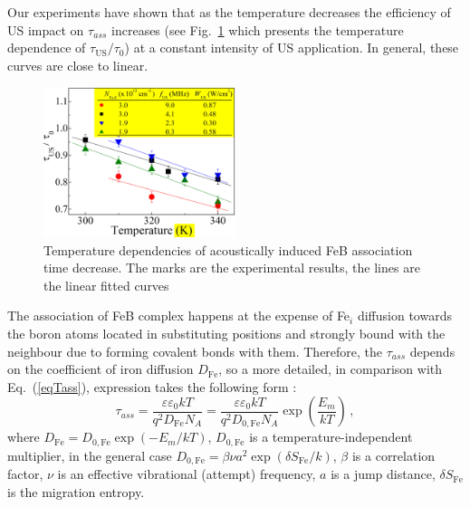 \documentclass[sn-mathphys]{sn-jnl}%
\theoremstyle{thmstyleone}%
\theoremstyle{thmstyletwo}%
\theoremstyle{thmstylethree}%
\begin{document}
Our experiments have shown that
as the temperature decreases the efficiency of US impact on $\tau_{ass}$ increases
(see Fig.~\ref{figTemp} which presents the temperature dependence of $\tau_\mathrm{US}/\tau_{0}$)
at a constant intensity of US application.
In general, these curves are close to linear.

\begin{figure}
\centering
 \includegraphics[width=0.5\textwidth]{Fig6}
\caption{
Temperature dependencies of  acoustically induced FeB association time decrease.
The marks are the experimental results, the lines are the linear fitted curves
}
\label{figTemp}       %
\end{figure}

The association of FeB complex happens at the  expense of  Fe$_i$ diffusion towards the
boron atoms located in substituting positions and strongly bound with the neighbour due to forming covalent bonds with them.
Therefore, the $\tau_{ass}$ depends on the coefficient of iron diffusion $D_\mathrm{Fe}$,
so a more detailed, in comparison with Eq.~(\ref{eqTass}), expression takes the following form \cite{FeBAssJAP2014,FeBJAP2005,FeBKin2019}:
\begin{equation}
\label{eqTass2}
\tau_{ass}=\frac{\varepsilon\varepsilon_0 kT}{q^2D_\mathrm{Fe}N_A}=
\frac{\varepsilon\varepsilon_0 kT}{q^2D_\mathrm{0,Fe}N_A}\exp\left(\frac{E_m}{kT}\right)\,,
\end{equation}
where
$D_\mathrm{Fe}=D_\mathrm{0,Fe}\exp(-E_m/kT)$,
$D_\mathrm{0,Fe}$ is a temperature-independent multiplier,
in the general case \cite{AZIZ2001,Stavola,WeberFe}
$D_\mathrm{0,Fe}=\beta\nu a^2\exp(\delta S_\mathrm{Fe}/k)$,
$\beta$ is a correlation factor,
$\nu$  is an effective vibrational (attempt) frequency,
$a$ is a jump distance,
$\delta S_\mathrm{Fe}$ is the migration entropy.
\end{document}
